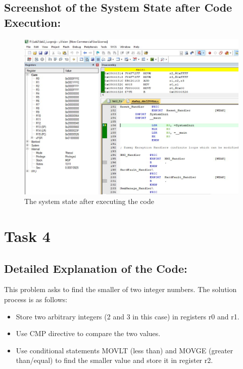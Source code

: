 \documentclass[12pt]{article}
\begin{document}
\pagebreak

\subsection{Screenshot of the System State after Code Execution:}
\begin{figure}[ht]
    \centering
    \includegraphics[scale=.7]{images/lab2_ss6.jpg}
    \caption{The system state after executing the code}
    \label{fig:after_task_three}
\end{figure}

\pagebreak


\section{Task 4}

\subsection{Detailed Explanation of the Code:}
This problem asks to find the smaller of two integer numbers. The solution process is as follows: 
\begin{itemize}
    \item Store two arbitrary integers (2 and 3 in this case) in registers r0 and r1.
    \item Use CMP directive to compare the two values.
    \item Use conditional statements MOVLT (less than) and MOVGE (greater than/equal) to find the smaller value and store it in register r2.
\end{itemize}
\end{document}
